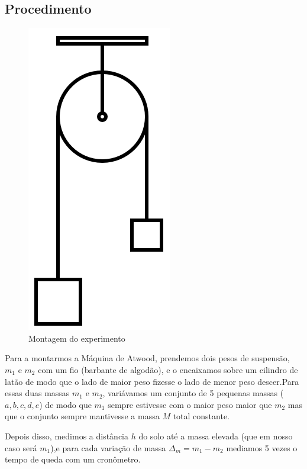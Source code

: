 \documentclass[a4paper]{article}
\begin{document}
\subsection{Procedimento}
\begin{figure}[!ht]
	\centering
	\includegraphics[scale=0.25]{Atwood_machine.jpg}
	\caption{Montagem do experimento}
\end{figure}

Para a montarmos a Máquina de Atwood, prendemos dois pesos de suspensão, $m_1$ e $m_2$ com um fio (barbante de algodão), e o encaixamos sobre um cilindro de latão de modo que o lado de maior peso fizesse o lado de menor peso descer.Para essas duas massas $m_1$ e $m_2$, variávamos um conjunto de 5 pequenas massas ($a , b ,  c ,  d ,  e$) de modo que $m_1$ sempre estivesse com o maior peso maior que $m_2$ mas que o conjunto sempre mantivesse a massa $M$ total constante.

Depois disso, medimos a distância $h$ do solo até a massa elevada (que em nosso caso será $m_1$),e para cada variação de massa $\Delta_{m} = {m_1} - {m_2}$ mediamos 5 vezes o tempo de queda com um cronômetro.
\end{document}
